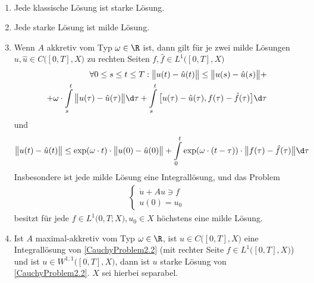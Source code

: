 \begin{theorem}\
\begin{enumerate}[label=(\alph*)]
\item Jede klassische Lösung ist starke Lösung.
\item Jede starke Lösung ist milde Lösung.
\item Wenn $A$ akkretiv vom Typ $\omega\in\R$ ist, dann gilt für je zwei milde Lösungen $u,\hat{u}\in C\big([0,T],X\big)$ zu rechten Seiten $f,\hat{f}\in L^1\big([0,T],X\big)$
\begin{align*}
\forall 0\leq s\leq t\leq T:
\big\Vert u(t)-\hat{u}(t)\big\Vert\leq\big\Vert u(s)-\hat{u}(s)\big\Vert+\\+\omega\cdot\int\limits_s^t\big\Vert u(\tau)-\hat{u}(\tau)\big\Vert\d\tau+\int\limits_s^t\big[u(\tau)-\hat{u}(\tau),f(\tau)-\hat{f}(\tau)\big]\d\tau
\end{align*}
und 
\begin{align*}
\big\Vert u(t)-\hat{u}(t)\big\Vert\leq\exp(\omega\cdot t)\cdot\big\Vert u(0)-\hat{u}(0)\big\Vert+\int\limits_0^t\exp(\omega\cdot(t-\tau))\cdot\big\Vert f(\tau)-\hat{f}(\tau)\big\Vert\d\tau
\end{align*}
Insbesondere ist jede milde Lösung eine Integrallösung, und das Problem 
\begin{align*}
\left\lbrace\begin{array}{c}
\dot{u}+Au\ni f\\
u(0)=u_0
\end{array}\right.
\end{align*}
besitzt für jede $f\in L^1\big(0,T;X),u_0\in X$ höchstens eine milde Lösung.
\item Ist $A$ maximal-akkretiv vom Typ $\omega\in\R$, ist $u\in C\big([0,T],X)$ eine Integrallösung von \eqref{CauchyProblem2.2} (mit rechter Seite $f\in L^1\big([0,T],X\big)$) und ist $u\in W^{1,1}\big([0,T],X\big)$, dann ist $u$ starke Lösung von \eqref{CauchyProblem2.2}. $X$ sei hierbei separabel.
\end{enumerate}
\end{theorem}

